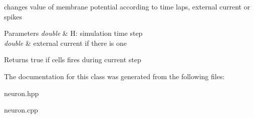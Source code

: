 changes value of membrane potential according to time laps, external current or spikes 
\begin{DoxyParams}{Parameters}
{\em double} & H\-: simulation time step \\
\hline
{\em double} & external current if there is one \\
\hline
\end{DoxyParams}
\begin{DoxyReturn}{Returns}
true if cells fires during current step 
\end{DoxyReturn}


The documentation for this class was generated from the following files\-:\begin{DoxyCompactItemize}
\item 
neuron.\-hpp\item 
neuron.\-cpp\end{DoxyCompactItemize}
